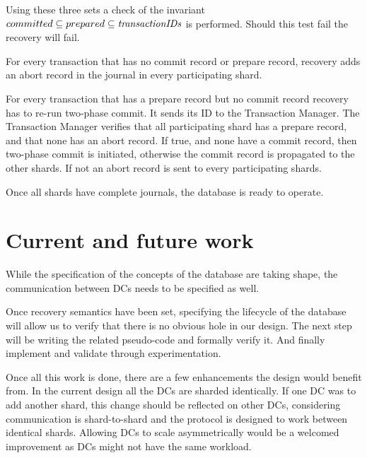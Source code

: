 \documentclass[twoside]{article}
\begin{document}
Using these three sets a check of the invariant $ committed 
\subseteq prepared \subseteq \emph{transactionIDs} $ is performed.
Should this test fail the recovery will fail.
 
For every transaction that has no commit record or prepare record, recovery adds an 
abort record in the journal in every participating shard. 

For every transaction that has a prepare record but no commit record recovery has 
to re-run two-phase commit.
It sends its ID to the Transaction Manager. 
The Transaction Manager verifies that all participating shard has a
prepare record, and that none has an abort record.
If true, and none have a commit record, then two-phase commit is 
initiated, otherwise the commit record is propagated to the other shards. 
If not an abort record is sent to every participating shards.

Once all shards have complete journals, the database is ready to operate.






\section{Current and future work}
\label{sec:current-future}

While the specification of the concepts of the database are taking shape, the
communication between DCs needs to be specified as well.

Once recovery semantics have been set, specifying the lifecycle of the
database will allow us to verify that there is no obvious hole in our design.
The next step will be writing the related pseudo-code and formally verify
it. 
And finally implement and validate through experimentation.

Once all this work is done, there are a few enhancements the design would benefit
from.
In the current design all the DCs are sharded identically. 
If one DC was to add another shard, this change should be reflected on other DCs,
considering communication is shard-to-shard and the protocol is designed to
work between identical shards.
Allowing DCs to scale asymmetrically would be a welcomed improvement as DCs
might not have the same workload.
\end{document}
